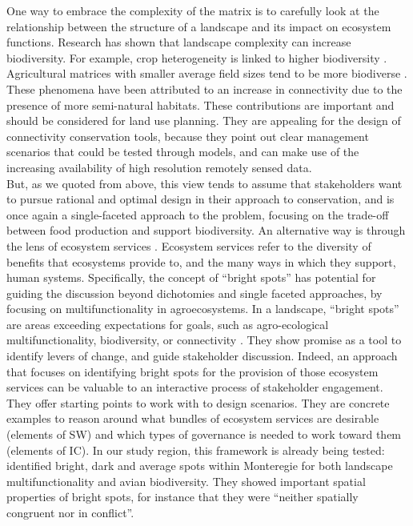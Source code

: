 \documentclass[12pt,Bold,TexShade]{thesis/mcgilletdclass}
\begin{document}
{One way to embrace the complexity of the matrix is to carefully look at the relationship between the structure of a landscape and its impact on ecosystem functions. Research has shown that landscape complexity can increase biodiversity. For example, crop heterogeneity is linked to higher biodiversity \citep{sirami_increasing_2019}. Agricultural matrices with smaller average field sizes tend to be more biodiverse \citep{fahrig_farmlands_2015}. These phenomena have been attributed to an increase in connectivity due to the presence of more semi-natural habitats. These contributions are important and should be considered for land use planning. They are appealing for the design of connectivity conservation tools, because they point out clear management scenarios that could be tested through models, and can make use of the increasing availability of high resolution remotely sensed data. \\

But, as we quoted from \cite{williamson_spatially_2018} above, this view tends to assume that stakeholders want to pursue rational and optimal design in their approach to conservation, and is once again a single-faceted approach to the problem, focusing on the trade-off between food production and support biodiversity. An alternative way is through the lens of ecosystem services  \cite{bennett_changing_2017}. Ecosystem services refer to the diversity of benefits that ecosystems provide to, and the many ways in which they support, human systems. Specifically, the concept of “bright spots” has potential for guiding the discussion beyond dichotomies and single faceted approaches, by focusing on multifunctionality in agroecosystems. In a landscape, “bright spots” are areas exceeding expectations for goals, such as agro-ecological multifunctionality, biodiversity, or connectivity \citep{frei_bright_2018}. They show promise as a tool  to identify levers of change, and guide stakeholder discussion. Indeed, an approach that focuses on identifying bright spots for the provision of those ecosystem services can be valuable to an interactive process of stakeholder engagement. They offer starting points to work with to design scenarios. They are concrete examples to reason around what bundles of ecosystem services are desirable (elements of SW) and which types of governance is needed to work toward them (elements of IC). In our study region, this framework is already being tested: \cite{frei_bright_2018} identified bright, dark and average spots within Monteregie for both landscape multifunctionality and avian biodiversity. They showed important spatial properties of bright spots, for instance that they were “neither spatially congruent nor in conflict”. \\

}
\end{document}
